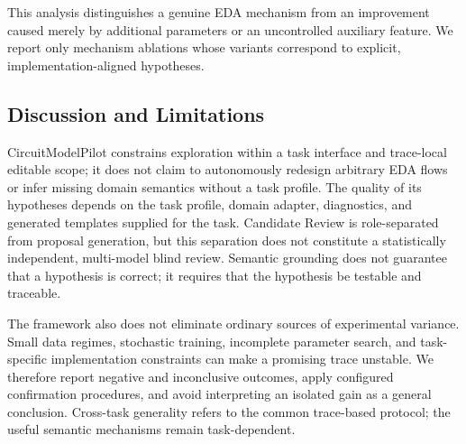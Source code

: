 This analysis distinguishes a genuine EDA mechanism from an improvement caused merely by additional parameters or an uncontrolled auxiliary feature. We report only mechanism ablations whose variants correspond to explicit, implementation-aligned hypotheses.


\subsection{Discussion and Limitations}
\label{sec:exp_discussion}

CircuitModelPilot constrains exploration within a task interface and trace-local editable scope; it does not claim to autonomously redesign arbitrary EDA flows or infer missing domain semantics without a task profile. The quality of its hypotheses depends on the task profile, domain adapter, diagnostics, and generated templates supplied for the task. Candidate Review is role-separated from proposal generation, but this separation does not constitute a statistically independent, multi-model blind review. Semantic grounding does not guarantee that a hypothesis is correct; it requires that the hypothesis be testable and traceable.

The framework also does not eliminate ordinary sources of experimental variance. Small data regimes, stochastic training, incomplete parameter search, and task-specific implementation constraints can make a promising trace unstable. We therefore report negative and inconclusive outcomes, apply configured confirmation procedures, and avoid interpreting an isolated gain as a general conclusion. Cross-task generality refers to the common trace-based protocol; the useful semantic mechanisms remain task-dependent.
